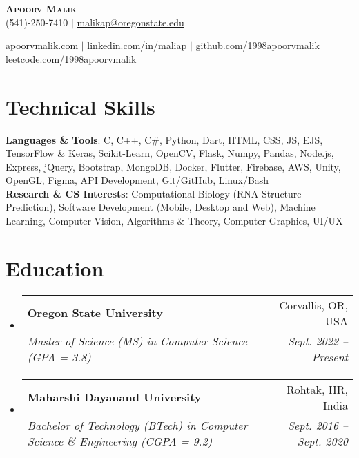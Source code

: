\documentclass[letterpaper,11pt]{article}
\makeatletter
\newcommand{\resumeSubheading}[4]{
  \vspace{-2pt}\item
    \begin{tabular*}{0.97\textwidth}[t]{l@{\extracolsep{\fill}}r}
      \textbf{#1} & #2 \\
      \textit{\small#3} & \textit{\small #4} \\
    \end{tabular*}\vspace{-7pt}
}
\newcommand{\resumeSubHeadingListStart}{\begin{itemize}[leftmargin=0.15in, label={}]}
\newcommand{\resumeSubHeadingListEnd}{\end{itemize}}
\makeatother
\begin{document}



\begin{center}
    \textbf{\Huge \scshape Apoorv Malik} \\ \vspace{5pt}
    (541)-250-7410 $|$ \href{mailto:malikap@oregonstate.edu}{\underline{malikap@oregonstate.edu}}
\end{center}

\begin{center} 
    \href{http://apoorvmalik.com}{\underline{apoorvmalik.com}} $|$
    \href{https://linkedin.com/in/maliap}{\underline{linkedin.com/in/maliap}} $|$
    \href{https://github.com/1998apoorvmalik}{\underline{github.com/1998apoorvmalik}} $|$
    \href{https://leetcode.com/1998apoorvmalik}{\underline{leetcode.com/1998apoorvmalik}}
\end{center}


\section{Technical Skills}
 \begin{itemize}[leftmargin=0.15in, label={}]
    \small{\item{
     \textbf{Languages \& Tools}{: C, C++, C\#, Python, Dart, HTML, CSS, JS, EJS, TensorFlow \& Keras, Scikit-Learn, OpenCV, Flask, Numpy, Pandas, Node.js, Express, jQuery, Bootstrap, MongoDB, Docker, Flutter, Firebase, AWS, Unity, OpenGL, Figma, API Development, Git/GitHub, Linux/Bash } \\

     \textbf{Research \& CS Interests}{: Computational Biology (RNA Structure Prediction), Software Development (Mobile, Desktop and Web), Machine Learning, Computer Vision, Algorithms \& Theory, Computer Graphics, UI/UX }
    }}
 \end{itemize}

\section{Education}
  \resumeSubHeadingListStart
    \resumeSubheading
      {Oregon State University}{Corvallis, OR, USA}
      {Master of Science (MS) in Computer Science (GPA = 3.8)}{Sept. 2022 – Present}
    \resumeSubheading
      {Maharshi Dayanand University}{Rohtak, HR, India}
      {Bachelor of Technology (BTech) in Computer Science \& Engineering (CGPA = 9.2)}{Sept. 2016 – Sept. 2020}
  \resumeSubHeadingListEnd
\end{document}
